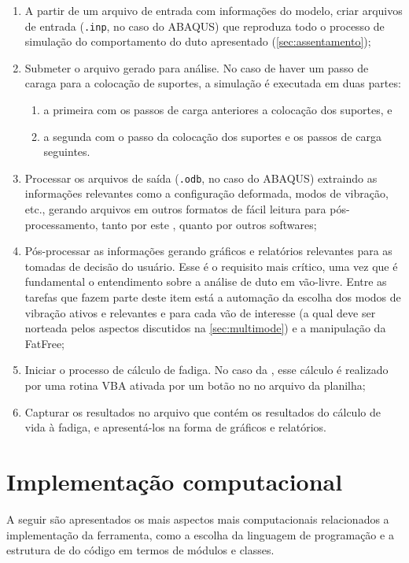 \begin{enumerate}[label= (\arabic*)]
    \item A partir de um arquivo de entrada com informações do modelo, criar arquivos de entrada (\texttt{.inp}, no caso do ABAQUS) que reproduza todo o processo de simulação do comportamento do duto apresentado (\autoref{sec:assentamento});
    \item Submeter o arquivo gerado para análise. No caso de haver um passo de caraga para a colocação de suportes, a simulação é executada em duas partes:
    \begin{enumerate}
        \item a primeira com os passos de carga anteriores a colocação dos suportes, e
        \item a segunda com o passo da colocação dos suportes e os passos de carga seguintes.
    \end{enumerate}
    \item Processar os arquivos de saída (\texttt{.odb}, no caso do ABAQUS) extraindo as informações relevantes como a configuração deformada, modos de vibração, etc., gerando arquivos em outros formatos de fácil leitura para pós-processamento, tanto por este \frame, quanto por outros softwares;
    \item Pós-processar as informações gerando gráficos e relatórios relevantes para as tomadas de decisão do usuário. Esse é o requisito mais crítico, uma vez que é fundamental o entendimento sobre a análise de duto em vão-livre. Entre as tarefas que fazem parte deste item está a automação da escolha dos modos de vibração ativos e relevantes e para cada vão de interesse (a qual deve ser norteada pelos aspectos discutidos na \autoref{sec:multimode}) e a manipulação da FatFree;
    \item Iniciar o processo de cálculo de fadiga. No caso da \fatfree, esse cálculo é realizado por uma rotina VBA ativada por um botão no no arquivo da planilha;
    \item Capturar os resultados no arquivo que contém os resultados do cálculo de vida à fadiga, e apresentá-los na forma de gráficos e relatórios.
\end{enumerate}


\section{Implementação computacional}


A seguir são apresentados os mais aspectos mais computacionais relacionados a implementação da ferramenta, como a escolha da linguagem de programação e a estrutura de do código em termos de módulos e classes.


